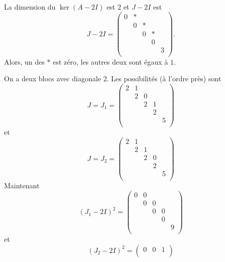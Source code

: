 \begin{example} 
\label{exe:54}
  La dimension du $\ker(A - 2 I)$ est $2$ et $J - 2I$ est
  \begin{displaymath}
     J  - 2I =
  \begin{pmatrix}
    0 & *  \\
    & 0 & * \\
    & & 0 & * \\
    & & & 0   \\
    & & & & 3 \\
  \end{pmatrix}. 
\end{displaymath}
Alors, un des $*$ est zéro, les autres deux sont égaux à $1$.

On a deux blocs avec diagonale $2$. Les possibilités (à l'ordre près) sont
\begin{displaymath}
J =   J_1 =  \begin{pmatrix}
    2 & 1  \\
    & 2 & 0 \\
    & & 2 & 1 \\
    & & & 2   \\
    & & & & 5 \\
  \end{pmatrix}
\end{displaymath}
et
\begin{displaymath}
J =   J_2 =  \begin{pmatrix}
    2 & 1  \\
    & 2 & 1 \\
    & & 2 & 0 \\
    & & & 2   \\
    & & & & 5 \\
  \end{pmatrix}
\end{displaymath}
Maintenant
\begin{displaymath}
  (J_1 - 2I)^2 =
  \begin{pmatrix}
     0 &0  \\
    & 0 & 0 \\
    & & 0 & 0 \\
    & & & 0   \\
    & & & & 9 \\
  \end{pmatrix}
\end{displaymath}
et
\begin{displaymath}
  (J_2 - 2I)^2 =
  \begin{pmatrix}
     0 &0 &1   \\

\end{pmatrix}
\end{displaymath}
\end{example}
